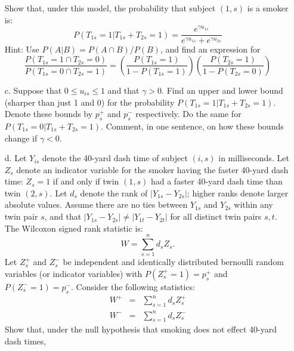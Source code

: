 \documentclass{article}
\begin{document}
\begin{itemize}
          Show that, under this model, the probability
          that subject $(1,s)$ is a smoker is:
          \begin{equation}
            P(T_{1s} = 1| T_{1s} + T_{2s} = 1) 
            = \frac{e^{\gamma u_{1s}}}{e^{\gamma u_{1s}} + e^{\gamma u_{2s}}}
            \label{aprobques}
          \end{equation}
          Hint: Use $P(A | B) = P(A\cap B)/P(B)$, and find an expression for
          $$
            \frac{P(T_{1s} = 1 \cap T_{2s} = 0)}{P(T_{1s} = 0 \cap T_{2s} = 1)} = 
            \left(\frac{P(T_{1s} = 1)}{1 - P(T_{1s} = 1)}\right)
            \left(\frac{P(T_{2s} = 1)}{1 - P(T_{2s} = 0)}\right)
          $$
        \item[c.]
          Suppose that $0 \leq u_{is} \leq 1$ and that $\gamma > 0$.
          Find an upper and lower bound (sharper than just 1 and 0) for the probability
          $P(T_{1s} = 1| T_{1s} + T_{2s} = 1).$
          Denote these bounds by $p^+_s$ and $p^-_s$ respectively.
          Do the same for $P(T_{1s} = 0| T_{1s} + T_{2s} = 1).$
          Comment, in one sentence, on how these bounds change if $\gamma < 0$.
        \item[d.]  Let $Y_{is}$ denote the 40-yard dash time of
          subject $(i,s)$ in milliseconds.  Let $Z_s$ denote an
          indicator variable for the smoker having the faster 40-yard
          dash time: $Z_s = 1$ if and only if twin $(1,s)$ had a
          faster 40-yard dash time than twin $(2,s)$.  Let $d_s$
          denote the rank of $|Y_{1s} - Y_{2s}|$; higher ranks denote
          larger absolute values.  Assume there are no ties between
          $Y_{1s}$ and $Y_{2s}$ within any twin pair $s$, and that
          $|Y_{1s} - Y_{2s}| \neq |Y_{1t} - Y_{2t}|$ for all distinct
          twin pairs $s,t$.  The Wilcoxon signed rank statistic is:
          $$
            W = \sum_{s=1}^n d_sZ_s.
          $$
          Let $Z^+_s$ and $Z^-_s$ be independent and identically distributed 
          bernoulli random variables (or indicator variables) with $P(Z^+_s = 1) = p^+_s$
          and $P(Z^-_s = 1) = p^-_s$.
          Consider the following statistics:
          \begin{eqnarray*}
            W^+ &=& \sum_{s=1}^n d_s Z^+_s \\
            W^- & = & \sum_{s=1}^n d_sZ^-_s
          \end{eqnarray*}
          Show that, under the null hypothesis that smoking does not effect 40-yard dash times, 

\end{itemize}
\end{document}
